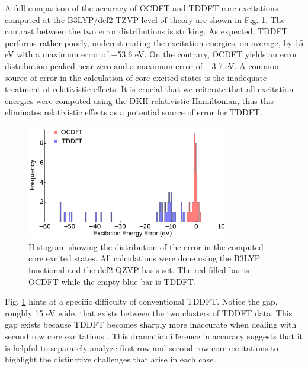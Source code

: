 \documentclass[8.5pt,twoside,twocolumn]{article}
\begin{document}
A full comparison of the accuracy of OCDFT and TDDFT core-excitations computed at the B3LYP/def2-TZVP level of theory are shown in Fig. \ref{figure:Hist}.
The contrast between the two error distributions is striking.  As expected, TDDFT performs rather poorly, underestimating the excitation energies, on average, by 15 eV with a maximum error of $-$53.6 eV. 
On the contrary, OCDFT yields an error distribution peaked near zero and a maximum error of $-$3.7 eV.
A common source of error in the calculation of core excited states is the inadequate treatment of relativistic effects. It is crucial that we reiterate that all excitation energies were computed using the DKH relativistic Hamiltonian, thus this eliminates relativistic effects as a potential source of error for TDDFT.\cite{saue_relativistic_2011}
\begin{figure}[!ht]
\centering
\includegraphics[width=8.8cm]{NEW_histogram2.pdf}
\caption{Histogram showing the distribution of the error in the computed core excited states. All calculations were done using the B3LYP functional and the def2-QZVP basis set. The red filled bar is OCDFT while the empty blue bar is TDDFT.}
\label{figure:Hist}
\end{figure}
Fig. \ref{figure:Hist} hints at a specific difficulty of conventional TDDFT. Notice the gap, roughly 15 eV wide, that exists between the two clusters of TDDFT data. This gap exists because TDDFT becomes sharply more inaccurate when dealing with second row core excitations \cite{nakata_extension_2007,besley_time-dependent_2009}. 
This dramatic difference in accuracy suggests that it is helpful to separately analyze first row and second row core excitations to highlight the distinctive challenges that arise in each case.
\end{document}
